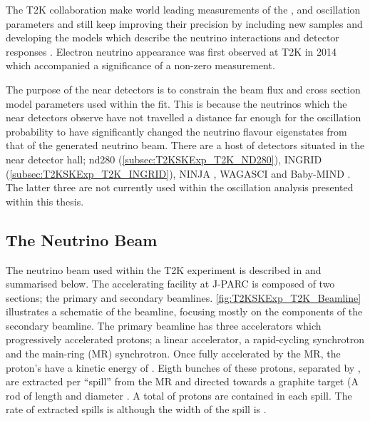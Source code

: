The T2K collaboration make world leading measurements of the \sinsqatm, \delmsqatm and \dcp oscillation parameters and still keep improving their precision by including new samples and developing the models which describe the neutrino interactions and detector responses . Electron neutrino appearance was first observed at T2K in 2014 \cite{2014_Abe_ElectronNuApp} which accompanied a \quickmath{7.3\sigma} significance of a non-zero \sinsqreac measurement.

The purpose of the near detectors is to constrain the beam flux and cross section model parameters used within the fit. This is because the neutrinos which the near detectors observe have not travelled a distance far enough for the oscillation probability to have significantly changed the neutrino flavour eigenstates from that of the generated neutrino beam. There are a host of detectors situated in the near detector hall; nd280 (\autoref{subsec:T2KSKExp_T2K_ND280}), INGRID (\autoref{subsec:T2KSKExp_T2K_INGRID}), NINJA \cite{ninja}, WAGASCI \cite{wagasci} and Baby-MIND \cite{baby_mind}. The latter three are not currently used within the oscillation analysis presented within this thesis.

\subsection{The Neutrino Beam}
\label{subsec:T2KSKExp_T2K_NeutrinoBeam}

The neutrino beam used within the T2K experiment is described in \cite{t2k_det, Abe_2013} and summarised below. The accelerating facility at J-PARC is composed of two sections; the primary and secondary beamlines. \autoref{fig:T2KSKExp_T2K_Beamline} illustrates a schematic of the beamline, focusing mostly on the components of the secondary beamline. The primary beamline has three accelerators which progressively accelerated protons; a linear accelerator, a rapid-cycling synchrotron and the main-ring (MR) synchrotron. Once fully accelerated by the MR, the proton's have a kinetic energy of . Eigth bunches of these protons, separated by , are extracted per ``spill'' from the MR and directed towards a graphite target (A rod of length  and diameter . A total of  protons are contained in each spill. The rate of extracted spills is  although the width of the spill is .

